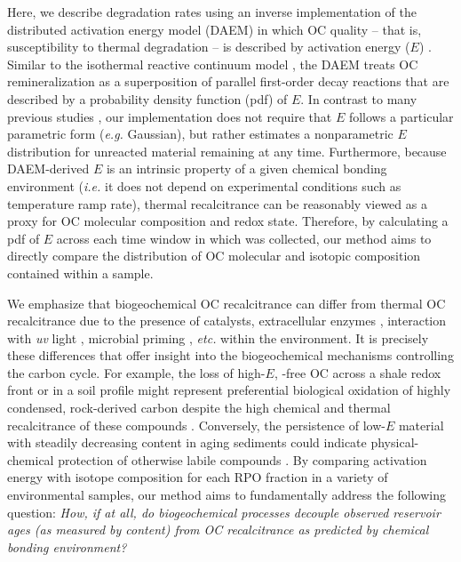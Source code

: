 Here, we describe degradation rates using an inverse implementation of the distributed activation energy model (DAEM) in which OC quality -- that is, susceptibility to thermal degradation -- is described by activation energy ($E$) \citep{Braun:1987vf,Burnham:1987ut,Cramer:2004tg}. Similar to the isothermal reactive continuum model \citep{Boudreau:1991wf,Forney:2012dr,Forney:2012hz}, the DAEM treats OC remineralization as a superposition of parallel first-order decay reactions that are described by a probability density function (pdf) of $E$. In contrast to many previous studies \citep[\textit{e.g.}][]{Lakshmanan:1994vs,Cai:2007hh,deCaprariis:2012jk}, our implementation does not require that $E$ follows a particular parametric form (\textit{e.g.} Gaussian), but rather estimates a nonparametric $E$ distribution for unreacted material remaining at any time. Furthermore, because DAEM-derived $E$ is an intrinsic property of a given chemical bonding environment (\textit{i.e.} it does not depend on experimental conditions such as temperature ramp rate), thermal recalcitrance can be reasonably viewed as a proxy for OC molecular composition and redox state. Therefore, by calculating a pdf of $E$ across each time window in which  was collected, our method aims to directly compare the distribution of OC molecular and isotopic composition contained within a sample.

We emphasize that biogeochemical OC recalcitrance can differ from thermal OC recalcitrance due to the presence of catalysts, extracellular enzymes \citep{Sinsabaugh:2008il,Arnosti:2011iv}, interaction with \textit{uv} light \citep{Spencer:2009vl}, microbial priming \citep{Bianchi:2011cu}, \textit{etc.} within the environment. It is precisely these differences that offer insight into the biogeochemical mechanisms controlling the carbon cycle. For example, the loss of high-$E$, -free OC across a shale redox front or in a soil profile might represent preferential biological oxidation of highly condensed, rock-derived carbon despite the high chemical and thermal recalcitrance of these compounds \citep{Petsch:2001eq,Rethemeyer:2004cy,Marschner:2008eo}. Conversely, the persistence of low-$E$ material with steadily decreasing  content in aging sediments could indicate physical-chemical protection of otherwise labile compounds \citep{Mayer:1994wn,Rothman:2007jq}. By comparing activation energy with isotope composition for each RPO fraction in a variety of environmental samples, our method aims to fundamentally address the following question: \textit{How, if at all, do biogeochemical processes decouple observed reservoir ages (as measured by  content) from OC recalcitrance as predicted by chemical bonding environment?}

